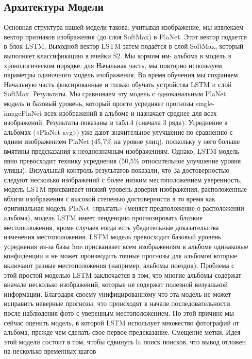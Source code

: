 \subsection{Архитектура Модели}
Основная структура нашей модели такова:
учитывая изображение, мы извлекаем вектор признаков изображения (до слоя SoftMax) в PlaNet. Этот вектор подается в блок LSTM. Выходной вектор LSTM затем подаётся в слой SoftMax, который
выполняет классификацию в ячейки S2. Мы кормим им-
альбома в модель в хронологическом порядке. для
Начальная часть, мы повторно используем параметры одиночного
модель изображения. Во время обучения мы сохраняем Начальную часть
фиксированные и только обучать устройства LSTM и слой SoftMax.
Результаты. Мы сравниваем эту модель с одноканальным PlaNet
модель и базовый уровень, который просто усредняет прогнозы single-imagePlaNet всех изображений в альбоме и назначает
среднее для всех изображений. Результаты показаны в табл.4 (сначала
3 ряда). Усреднение в альбомах («PlaNet avg») уже
дают значительное улучшение по сравнению с одним изображением PlaNet
(45,7\% на уровне улиц), поскольку у него больше
вмятины предсказания к неоднозначным изображениям. Однако, LSTM
модель явно превосходит технику усреднения (50,5\%
относительное улучшение уровня улицы). Визуальный контроль
результатов показали, что
За достоверностью следуют несколько изображений с более низким местоположением
уверенность, модель LSTM присваивает низкий уровень доверия
изображения, расположенные вблизи изображения с высокой степенью достоверности в то время как оригинальная модель PlaNet «прыгать» (меняет предположение о расположении альбома), модель LSTM имеет тенденцию прогнозировать близкие местоположения, кроме случаев еогда
есть убедительные доказательства изменения местоположения. LSTM
модель превосходит базовый уровень усреднения из-за базы
line присваивает всем изображениям в альбоме одинаковые конфиденции
и не может производить точные прогнозы для альбомов
которые включают разные местоположения (например, альбомы поездок).
Проблема с этой простой моделью LSTM заключается в том, что многие
альбомы содержат вначале несколько изображений, которые
не содержат полезной визуальной информации. Благодаря своему унифицированному
что эта модель не может исправить неверные прогнозы, что
происходят в начале последовательности после наблюдения
фото с уверенным местоположением. По этой причине мы сейчас
оценить модель, в которой LSTM использует множество фотографий
от альбома, прежде чем сделать свое первое предсказание.
Смещение метки. Идея этой модели состоит в том, чтобы сдвинуть la
поиск поисков, что вывод отложен на несколько временных шагов
